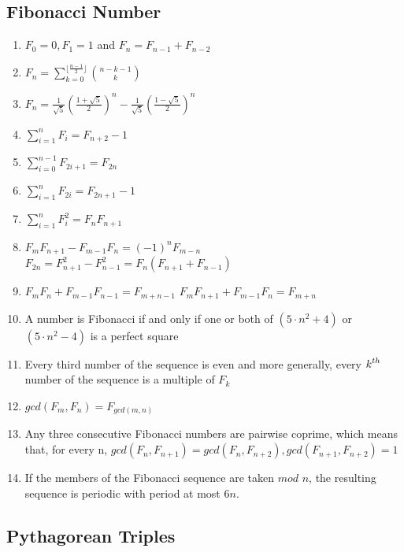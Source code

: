 \subsection{Fibonacci Number}

\begin{enumerate}[resume]
    \item $\displaystyle F_0=0, F_1=1$ and $\displaystyle F_n=F_{n-1}+F_{n-2}$
    \item $\displaystyle F_n=\sum\limits_{k=0}^{\lfloor\frac{n-1}{2}\rfloor}\binom{n-k-1}{k}$
    \item $\displaystyle F_n=\frac{1}{\sqrt{5}}(\frac{1+\sqrt{5}}{2})^n-\frac{1}{\sqrt{5}}(\frac{1-\sqrt{5}}{2})^n$
    \item $\displaystyle \sum\limits_{i=1}^{n}F_i=F_{n+2}-1$
    \item $\displaystyle \sum\limits_{i=0}^{n-1}F_{2i+1}=F_{2n}$
    \item $\displaystyle \sum\limits_{i=1}^{n}F_{2i}=F_{2n+1}-1$
    \item $\displaystyle \sum\limits_{i=1}^{n}F_{i}^{2}=F_nF_{n+1}$
    \item $\displaystyle F_mF_{n+1}-F_{m-1}F_{n}=(-1)^nF_{m-n}$
    $\displaystyle F_{2n}=F_{n+1}^2-F_{n-1}^2=F_n(F_{n+1}+F_{n-1})$
    \item $\displaystyle F_mF_n+F_{m-1}F_{n-1}=F_{m+n-1}$
    $\displaystyle F_mF_{n+1}+F_{m-1}F_{n}=F_{m+n}$
    \item A number is Fibonacci if and only if one or both of $\displaystyle (5 \cdot n^2 + 4)$ or $\displaystyle (5 \cdot n^2 - 4)$ is a perfect square
    \item Every third number of the sequence is even and more generally, every $\displaystyle \displaystyle k^{th}$ number of the sequence is a multiple of $\displaystyle F_k$
    \item $gcd(F_m, F_n)=F_{gcd(m, n)}$
    \item Any three consecutive Fibonacci numbers are pairwise coprime, which means that, for every n, $gcd(F_n, F_{n+1})=gcd(F_n, F_{n+2}), gcd(F_{n+1}, F_{n+2})=1$
    \item If the members of the Fibonacci sequence are taken $mod$ $n$, the resulting sequence is periodic with period at most $6n$.
\end{enumerate}

\subsection{Pythagorean Triples}

